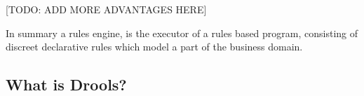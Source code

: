[TODO: ADD MORE ADVANTAGES HERE]


In summary a rules engine, is the executor of a rules based program, consisting of discreet declarative rules which model a part of the business domain.

\subsection{What is Drools?}




